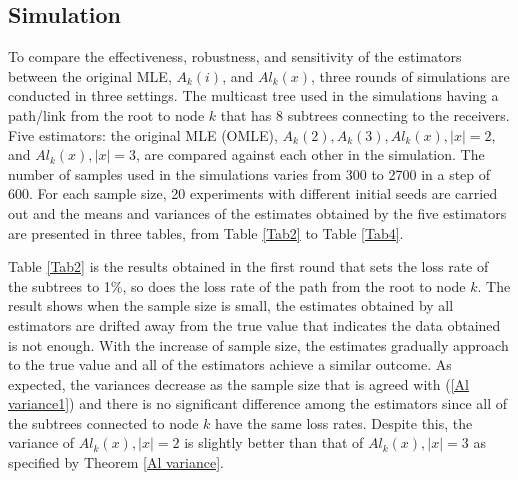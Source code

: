 \documentclass[10pt,onecolumn]{IEEEtran}
\begin{document}
\subsection{Simulation}

To compare the effectiveness, robustness, and sensitivity of the estimators between the original MLE, $A_k(i)$, and $Al_k(x)$, three rounds of simulations are conducted in three settings. The multicast tree used in the simulations having a path/link from the root to node $k$ that has 8 subtrees connecting to the receivers. Five estimators: the original MLE (OMLE), $ A_k(2), A_k(3), Al_k(x), |x|=2$,  and $Al_k(x), |x|=3$, are compared against each other in the simulation. The number of samples used in the simulations varies from 300 to 2700 in a step of 600. For each sample size, 20 experiments with different initial seeds are carried out and the means and variances of the estimates obtained by the five estimators are presented in three tables, from Table \ref{Tab2} to Table \ref{Tab4}.

 Table \ref{Tab2} is the results obtained in the first round that sets the loss rate of the subtrees to 1\%, so does the loss rate of the path from the root to node $k$.  The result shows when the sample size is small, the estimates obtained by all estimators are drifted away from the true value that indicates the data obtained is not enough. With the increase of sample size, the estimates gradually approach to the true value and all of the estimators achieve a  similar outcome. As expected, the variances decrease as the sample size that is agreed with (\ref{Al variance1}) and there is no significant difference among the estimators since all of the subtrees connected to node $k$ have the same loss rates. Despite this, the variance of $Al_k(x), |x|=2$ is slightly better than that of $Al_k(x), |x|=3$ as specified by Theorem \ref{Al variance}.
\end{document}
